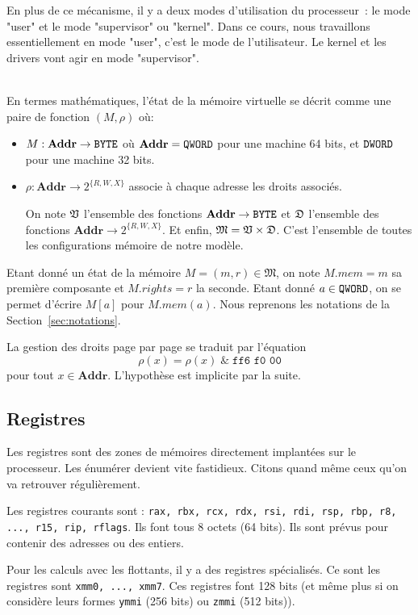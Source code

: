\documentclass{book}
\newenvironment{formalisme}[1]{%
	\def\FrameCommand{\fboxrule=\FrameRule\fboxsep=\FrameSep \fcolorbox{red!10}{red!5}}%
	\MakeFramed {\advance\hsize-\width \FrameRestore}
	\noindent {\bf #1}\\
}%
{\endMakeFramed}
\newcommand{\code}[1]{\texttt{#1}}
\newcommand{\BYTE}{{\tt BYTE}}
\newcommand{\DWORD}{{\tt DWORD}}
\newcommand{\QWORD}{{\tt QWORD}}
\newcommand{\Memory}{{\mathfrak{M}}}
\newcommand{\Addr}{{\mathbf{Addr}}}
\begin{document}
\medskip
En plus de ce mécanisme, il y a deux modes d'utilisation du processeur~: le mode "user" et le mode "supervisor" ou "kernel". Dans ce cours, nous travaillons essentiellement en mode "user", c'est le mode de l'utilisateur. Le kernel et les drivers vont agir en mode "supervisor". 

\begin{formalisme}{La mémoire virtuelle}
En termes mathématiques, l'état de la mémoire virtuelle se décrit comme une paire de fonction $(M,\rho)$ où:
\begin{itemize}
	\item $M : \Addr \to \BYTE$ où $\Addr = \QWORD$ pour une machine 64 bits, et $\DWORD$ pour une machine 32 bits.
	\item $\rho: \Addr \to 2^{\{R, W, X\}}$ associe à chaque adresse les droits associés.
	
On note $\frak{V}$ l'ensemble des fonctions $\Addr \to \BYTE$ et $\frak{D}$ l'ensemble des fonctions $\Addr \to 2^{\{R, W, X\}}$. Et enfin, $\Memory = \frak{V} \times \frak{D}$. C'est l'ensemble de toutes les configurations mémoire de notre modèle. 
\end{itemize}

Etant donné un état de la mémoire $M = (m,r) \in \Memory$, on note $M.mem = m$ sa première composante et $M.rights = r$ la seconde. Etant donné $a \in \QWORD$, on se permet d'écrire $M[a]$ pour $M.mem(a)$. Nous reprenons les notations de la Section~\ref{sec:notations}.

La gestion des droits page par page se traduit par l'équation $$\rho(x) = \rho(x)\; \& \; \code{ff\^{}6 f0 00}$$ pour tout $x\in \Addr$. L'hypothèse est implicite par la suite. 	
\end{formalisme}

\subsection{Registres}
Les registres sont des zones de mémoires directement implantées sur le processeur. Les énumérer devient vite fastidieux. Citons quand même ceux qu'on va retrouver régulièrement. 

Les registres courants sont : {\tt rax, rbx, rcx, rdx, rsi, rdi, rsp, rbp, r8, ..., r15, rip, rflags}. Ils font tous 8 octets (64 bits). Ils sont prévus pour contenir des adresses ou des entiers.

Pour les calculs avec les flottants, il y a des registres spécialisés. Ce sont les registres sont {\tt xmm0, ..., xmm7}. Ces registres font 128 bits (et même plus si on considère leurs formes {\tt ymmi} (256 bits) ou {\tt zmmi} (512 bits)). 
\end{document}

